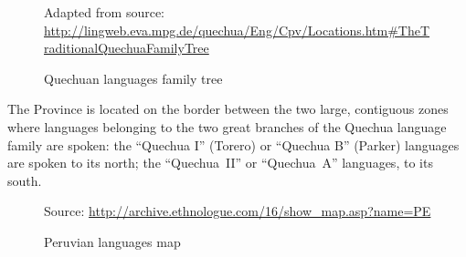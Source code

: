 \begin{figure}[!ht]
{}
\caption{Quechuan languages family tree}\label{Fig1}
\raggedright
{\scriptsize Adapted from source: \url{http://lingweb.eva.mpg.de/quechua/Eng/Cpv/Locations.htm#TheTraditionalQuechuaFamilyTree}}
\end{figure}

The Province is located on the border between the two large, contiguous zones where languages belonging to the two great branches of the Quechua language family are spoken: the “Quechua I” (Torero) or “Quechua B” (Parker) languages are spoken to its north; the “Quechua~II” or “Quechua~A” languages, to its south. 

\begin{figure}


\caption{Peruvian languages map}\label{Figcomp}
\raggedright
{\scriptsize Source: \url{http://archive.ethnologue.com/16/show_map.asp?name=PE}}
\end{figure}

